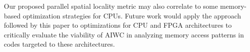 \documentclass[review=false, sigchi]{acmart}
\begin{document}
	Our proposed parallel spatial locality metric may also correlate to some memory-based optimization strategies for CPUs. 
	Future work would apply the approach followed by this paper to optimizations for CPU and FPGA architectures to critically evaluate the viability of AIWC in analyzing memory access patterns in codes targeted to these architectures.
	
	
	
	
	
	\pagebreak
	
\end{document}
